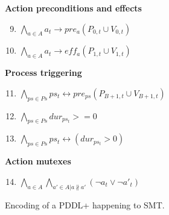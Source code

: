 \begin{figure}[thb!]
\textbf{Action preconditions and effects}
\begin{enumerate}[label=H\arabic*.]\setcounter{enumi}{8}
 \item $\bigwedge_{a \in A} a_t \rightarrow pre_{a}(P_{0,t} \cup V_{0,t})$
 \item $\bigwedge_{a \in A} a_t \rightarrow eff_{a}(P_{1,t} \cup V_{1,t})$
\end{enumerate}
\textbf{Process triggering}
\begin{enumerate}[label=H\arabic*.]\setcounter{enumi}{10}
 \item $\bigwedge_{ps\in Ps} ps_t \leftrightarrow pre_{ps}(P_{B+1,t} \cup V_{B+1,t})$
 \item $\bigwedge_{ps\in Ps} dur_{ps_t} >= 0$
 \item $\bigwedge_{ps\in Ps} ps_t \leftrightarrow (dur_{ps_t} > 0)$
\end{enumerate}
\textbf{Action mutexes}
\begin{enumerate}[label=H\arabic*.]\setcounter{enumi}{13}
 \item $\bigwedge_{a \in A} \bigwedge_{a' \in A | a \nparallel a'} (\neg a_t \vee \neg a'_t)$
\end{enumerate}
\caption{Encoding of a PDDL+ happening to SMT.}
\label{eq:state}
\end{figure}

\smallskip

